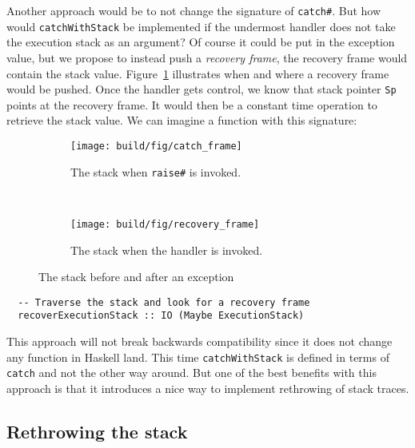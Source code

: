 Another approach would be to not change the signature of
\texttt{catch\#}. But how would \texttt{catchWithStack} be implemented if
the undermost handler does not take the execution stack as an argument?
Of course it could be put in the exception value, but we propose to
instead push a \emph{recovery frame}, the recovery frame would contain
the stack value. Figure~\ref{fig:recovery_frame} illustrates when and
where a recovery frame would be pushed. Once the handler
gets control, we know that stack pointer \texttt{Sp} points
at the recovery frame. It would then be a constant time operation to
retrieve the stack value. We can imagine a function with this
signature:

\begin{figure}
\begin{mdframed}
  \begin{subfigure}[t]{0.5\textwidth}
    \texttt{[image: build/fig/catch\_frame]}
    \caption{The stack when \texttt{raise\#} is invoked.}
  \end{subfigure}
        ~ %
  \begin{subfigure}[t]{0.5\textwidth}
    \texttt{[image: build/fig/recovery\_frame]}
    \caption{The stack when the handler is invoked.}
  \end{subfigure}
  \caption{The stack before and after an exception}
  \label{fig:recovery_frame}
\end{mdframed}
\end{figure}

\begin{verbatim}
  -- Traverse the stack and look for a recovery frame
  recoverExecutionStack :: IO (Maybe ExecutionStack)
\end{verbatim}

This approach will not break backwards compatibility since it does not
change any function in Haskell land. This time \texttt{catchWithStack}
is defined in terms of \texttt{catch} and not the other way around.
But one of the best benefits with this approach is that it introduces a
nice way to implement rethrowing of stack traces.



\subsection{Rethrowing the stack} \label{sec:rethrowing_the_stack}

